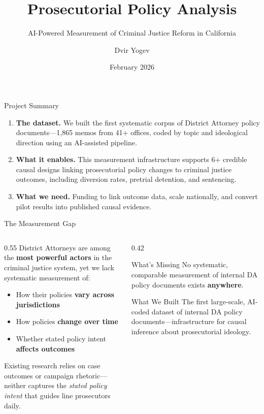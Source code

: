 \documentclass[aspectratio=169, 11pt]{beamer}
\title{Prosecutorial Policy Analysis}
\subtitle{AI-Powered Measurement of Criminal Justice Reform in California}
\author{Dvir Yogev}
\institute{Center for Law \& Justice, UC Berkeley School of Law}
\date{February 2026}
\begin{document}
\maketitle

\begin{frame}{Project Summary}
\begin{enumerate}\setlength\itemsep{10pt}
    \item \textbf{The dataset.} We built the first systematic corpus of District Attorney policy documents---1,865 memos from 41+ offices, coded by topic and ideological direction using an AI-assisted pipeline.
    \item \textbf{What it enables.} This measurement infrastructure supports 6+ credible causal designs linking prosecutorial policy changes to criminal justice outcomes, including diversion rates, pretrial detention, and sentencing.
    \item \textbf{What we need.} Funding to link outcome data, scale nationally, and convert pilot results into published causal evidence.
\end{enumerate}
\end{frame}

\begin{frame}{The Measurement Gap}
\begin{columns}[T]
\begin{column}{0.55\textwidth}
District Attorneys are among the \textbf{most powerful actors} in the criminal justice system, yet we lack systematic measurement of:
\begin{itemize}
    \item How their policies \textbf{vary across jurisdictions}
    \item How policies \textbf{change over time}
    \item Whether stated policy intent \textbf{affects outcomes}
\end{itemize}
\vspace{6pt}
Existing research relies on case outcomes or campaign rhetoric---neither captures the \emph{stated policy intent} that guides line prosecutors daily.
\end{column}
\begin{column}{0.42\textwidth}
\begin{alertblock}{What's Missing}
No systematic, comparable measurement of internal DA policy documents exists \textbf{anywhere}.
\end{alertblock}
\vspace{6pt}
\begin{exampleblock}{What We Built}
The first large-scale, AI-coded dataset of internal DA policy documents---infrastructure for causal inference about prosecutorial ideology.
\end{exampleblock}
\end{column}
\end{columns}
\end{frame}
\end{document}
